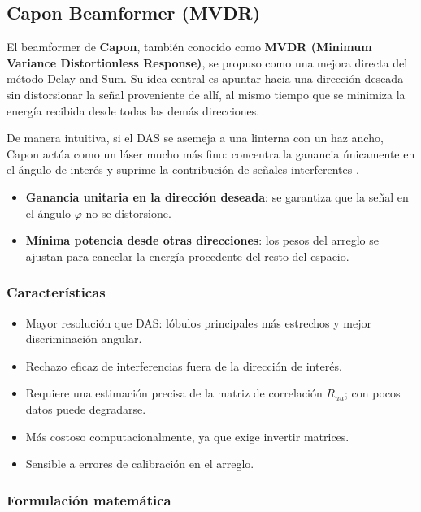 \subsection{Capon Beamformer (MVDR)}\label{sec:doa:capon}

El beamformer de \textbf{Capon}, también conocido como 
\textbf{MVDR (Minimum Variance Distortionless Response)}, 
se propuso como una mejora directa del método Delay-and-Sum.  
Su idea central es apuntar hacia una dirección deseada sin distorsionar la señal proveniente de allí, 
al mismo tiempo que se minimiza la energía recibida desde todas las demás direcciones.  

De manera intuitiva, si el DAS se asemeja a una linterna con un haz ancho, 
Capon actúa como un láser mucho más fino: concentra la ganancia únicamente en el ángulo de interés 
y suprime la contribución de señales interferentes \cite{YangBook}.

\begin{itemize}
	\item \textbf{Ganancia unitaria en la dirección deseada}: se garantiza que la señal en el ángulo $\varphi$ no se distorsione.  
	\item \textbf{Mínima potencia desde otras direcciones}: los pesos del arreglo se ajustan para cancelar la energía procedente del resto del espacio.  
\end{itemize}

\subsubsection*{Características}
\begin{itemize}
	\item Mayor resolución que DAS: lóbulos principales más estrechos y mejor discriminación angular.  
	\item Rechazo eficaz de interferencias fuera de la dirección de interés.  
	\item Requiere una estimación precisa de la matriz de correlación $R_{uu}$; con pocos datos puede degradarse.  
	\item Más costoso computacionalmente, ya que exige invertir matrices.  
	\item Sensible a errores de calibración en el arreglo.  
\end{itemize}

\subsubsection*{Formulación matemática}

